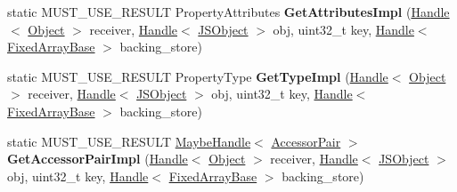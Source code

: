 \begin{DoxyCompactItemize}
\item 
\hypertarget{classv8_1_1internal_1_1_elements_accessor_base_a5f2f237edc867f2d70341f6517c60666}{}static M\+U\+S\+T\+\_\+\+U\+S\+E\+\_\+\+R\+E\+S\+U\+L\+T Property\+Attributes {\bfseries Get\+Attributes\+Impl} (\hyperlink{classv8_1_1internal_1_1_handle}{Handle}$<$ \hyperlink{classv8_1_1internal_1_1_object}{Object} $>$ receiver, \hyperlink{classv8_1_1internal_1_1_handle}{Handle}$<$ \hyperlink{classv8_1_1internal_1_1_j_s_object}{J\+S\+Object} $>$ obj, uint32\+\_\+t key, \hyperlink{classv8_1_1internal_1_1_handle}{Handle}$<$ \hyperlink{classv8_1_1internal_1_1_fixed_array_base}{Fixed\+Array\+Base} $>$ backing\+\_\+store)\label{classv8_1_1internal_1_1_elements_accessor_base_a5f2f237edc867f2d70341f6517c60666}

\item 
\hypertarget{classv8_1_1internal_1_1_elements_accessor_base_a558abe494eed21571bf45b1b003e7635}{}static M\+U\+S\+T\+\_\+\+U\+S\+E\+\_\+\+R\+E\+S\+U\+L\+T Property\+Type {\bfseries Get\+Type\+Impl} (\hyperlink{classv8_1_1internal_1_1_handle}{Handle}$<$ \hyperlink{classv8_1_1internal_1_1_object}{Object} $>$ receiver, \hyperlink{classv8_1_1internal_1_1_handle}{Handle}$<$ \hyperlink{classv8_1_1internal_1_1_j_s_object}{J\+S\+Object} $>$ obj, uint32\+\_\+t key, \hyperlink{classv8_1_1internal_1_1_handle}{Handle}$<$ \hyperlink{classv8_1_1internal_1_1_fixed_array_base}{Fixed\+Array\+Base} $>$ backing\+\_\+store)\label{classv8_1_1internal_1_1_elements_accessor_base_a558abe494eed21571bf45b1b003e7635}

\item 
\hypertarget{classv8_1_1internal_1_1_elements_accessor_base_a93f3fe18a37cfd527c2b077683a01147}{}static M\+U\+S\+T\+\_\+\+U\+S\+E\+\_\+\+R\+E\+S\+U\+L\+T \hyperlink{classv8_1_1internal_1_1_maybe_handle}{Maybe\+Handle}$<$ \hyperlink{classv8_1_1internal_1_1_accessor_pair}{Accessor\+Pair} $>$ {\bfseries Get\+Accessor\+Pair\+Impl} (\hyperlink{classv8_1_1internal_1_1_handle}{Handle}$<$ \hyperlink{classv8_1_1internal_1_1_object}{Object} $>$ receiver, \hyperlink{classv8_1_1internal_1_1_handle}{Handle}$<$ \hyperlink{classv8_1_1internal_1_1_j_s_object}{J\+S\+Object} $>$ obj, uint32\+\_\+t key, \hyperlink{classv8_1_1internal_1_1_handle}{Handle}$<$ \hyperlink{classv8_1_1internal_1_1_fixed_array_base}{Fixed\+Array\+Base} $>$ backing\+\_\+store)\label{classv8_1_1internal_1_1_elements_accessor_base_a93f3fe18a37cfd527c2b077683a01147}


\end{DoxyCompactItemize}
